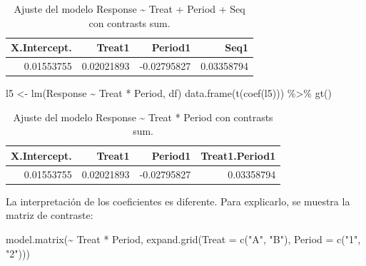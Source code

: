 \documentclass[
  12pt,
  a4paper,
  extrafontsizes,
  onecolumn,
  openright,
  table]{memoir}
\newenvironment{Shaded}{\begin{snugshade}}{\end{snugshade}}
\newcommand{\AttributeTok}[1]{\textcolor[rgb]{0.40,0.45,0.13}{#1}}
\newcommand{\FunctionTok}[1]{\textcolor[rgb]{0.28,0.35,0.67}{#1}}
\newcommand{\NormalTok}[1]{\textcolor[rgb]{0.00,0.23,0.31}{#1}}
\newcommand{\OtherTok}[1]{\textcolor[rgb]{0.00,0.23,0.31}{#1}}
\newcommand{\SpecialCharTok}[1]{\textcolor[rgb]{0.37,0.37,0.37}{#1}}
\newcommand{\StringTok}[1]{\textcolor[rgb]{0.13,0.47,0.30}{#1}}
\begin{document}
\hypertarget{tbl-l4}{}
\begin{longtable}{rrrr}
\caption{\label{tbl-l4}Ajuste del modelo Response \textasciitilde{} Treat + Period + Seq con
contrasts sum. }\tabularnewline

\toprule
X.Intercept. & Treat1 & Period1 & Seq1 \\ 
\midrule
0.01553755 & 0.02021893 & -0.02795827 & 0.03358794 \\ 
\bottomrule
\end{longtable}

\normalsize

\scriptsize

\begin{Shaded}
\begin{Highlighting}[]
\NormalTok{l5 }\OtherTok{\textless{}{-}} \FunctionTok{lm}\NormalTok{(Response }\SpecialCharTok{\textasciitilde{}}\NormalTok{ Treat }\SpecialCharTok{*}\NormalTok{ Period, df)}
\FunctionTok{data.frame}\NormalTok{(}\FunctionTok{t}\NormalTok{(}\FunctionTok{coef}\NormalTok{(l5))) }\SpecialCharTok{\%\textgreater{}\%} \FunctionTok{gt}\NormalTok{()}
\end{Highlighting}
\end{Shaded}

\hypertarget{tbl-l5}{}
\begin{longtable}{rrrr}
\caption{\label{tbl-l5}Ajuste del modelo Response \textasciitilde{} Treat * Period con
contrasts sum. }\tabularnewline

\toprule
X.Intercept. & Treat1 & Period1 & Treat1.Period1 \\ 
\midrule
0.01553755 & 0.02021893 & -0.02795827 & 0.03358794 \\ 
\bottomrule
\end{longtable}

\normalsize

La interpretación de los coeficientes es diferente. Para explicarlo, se
muestra la matriz de contraste:

\scriptsize

\begin{Shaded}
\begin{Highlighting}[]
\FunctionTok{model.matrix}\NormalTok{(}\SpecialCharTok{\textasciitilde{}}\NormalTok{ Treat }\SpecialCharTok{*}\NormalTok{ Period, }\FunctionTok{expand.grid}\NormalTok{(}\AttributeTok{Treat =} \FunctionTok{c}\NormalTok{(}\StringTok{"A"}\NormalTok{, }\StringTok{"B"}\NormalTok{), }\AttributeTok{Period =} \FunctionTok{c}\NormalTok{(}\StringTok{"1"}\NormalTok{, }\StringTok{"2"}\NormalTok{)))}
\end{Highlighting}
\end{Shaded}
\end{document}

